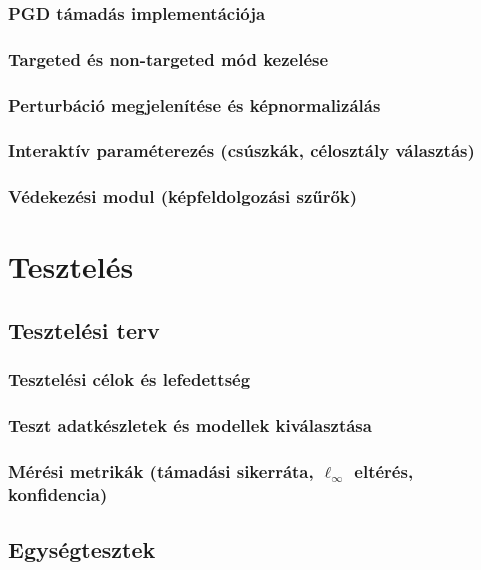 \documentclass[12pt,a4paper]{article}
\begin{document}
\subsubsection{PGD támadás implementációja}

\subsubsection{Targeted és non-targeted mód kezelése}

\subsubsection{Perturbáció megjelenítése és képnormalizálás}

\subsubsection{Interaktív paraméterezés (csúszkák, célosztály választás)}

\subsubsection{Védekezési modul (képfeldolgozási szűrők)}

\newpage
\section{Tesztelés}

\subsection{Tesztelési terv}

\subsubsection{Tesztelési célok és lefedettség}

\subsubsection{Teszt adatkészletek és modellek kiválasztása}

\subsubsection{Mérési metrikák (támadási sikerráta, $\ell_\infty$ eltérés, konfidencia)}

\subsection{Egységtesztek}
\end{document}

